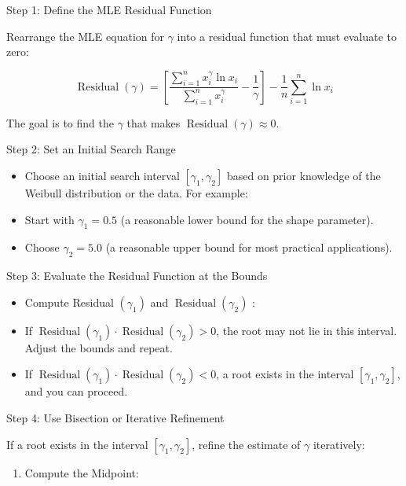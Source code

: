 \documentclass[
  12 pt,
  a4paper,
]{book}
\providecommand{\tightlist}{%
  \setlength{\itemsep}{0pt}\setlength{\parskip}{0pt}}
\numberwithin{equation}{section}
\theoremstyle{plain}      %
\theoremstyle{definition} %
\theoremstyle{remark}     %
\theoremstyle{note}         %
\begin{document}
Step 1: Define the MLE Residual Function

Rearrange the MLE equation for \(\gamma\) into a residual function that
must evaluate to zero:

\[
\operatorname{Residual}(\gamma)=\left[\frac{\sum_{i=1}^n x_i^\gamma \ln x_i}{\sum_{i=1}^n x_i^\gamma}-\frac{1}{\gamma}\right]-\frac{1}{n} \sum_{i=1}^n \ln x_i
\]

The goal is to find the \(\gamma\) that makes
\(\operatorname{Residual}(\gamma) \approx 0\).

Step 2: Set an Initial Search Range

\begin{itemize}
\tightlist
\item
  Choose an initial search interval \(\left[\gamma_1, \gamma_2\right]\)
  based on prior knowledge of the Weibull distribution or the data. For
  example:
\item
  Start with \(\gamma_1=0.5\) (a reasonable lower bound for the shape
  parameter).
\item
  Choose \(\gamma_2=5.0\) (a reasonable upper bound for most practical
  applications).
\end{itemize}

Step 3: Evaluate the Residual Function at the Bounds

\begin{itemize}
\tightlist
\item
  Compute Residual \(\left(\gamma_1\right)\) and
  \(\operatorname{Residual}\left(\gamma_2\right)\) :
\item
  If
  \(\operatorname{Residual}\left(\gamma_1\right) \cdot \operatorname{Residual}\left(\gamma_2\right)>0\),
  the root may not lie in this interval. Adjust the bounds and repeat.
\item
  If
  \(\operatorname{Residual}\left(\gamma_1\right) \cdot \operatorname{Residual}\left(\gamma_2\right)<0\),
  a root exists in the interval \(\left[\gamma_1, \gamma_2\right]\), and
  you can proceed.
\end{itemize}

Step 4: Use Bisection or Iterative Refinement

If a root exists in the interval \(\left[\gamma_1, \gamma_2\right]\),
refine the estimate of \(\gamma\) iteratively:

\begin{enumerate}
\def\labelenumi{\arabic{enumi}.}
\tightlist
\item
  Compute the Midpoint:
\end{enumerate}
\end{document}
